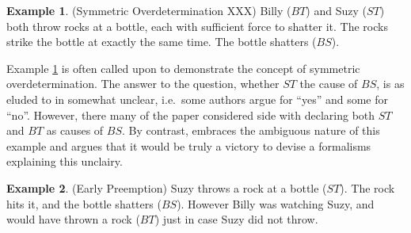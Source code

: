 \documentclass[11pt,a4paper]{book}
\theoremstyle{definition}
\theoremstyle{definition}
\newtheorem{example}{Example}[section]
\theoremstyle{definition}
\theoremstyle{remark}
\begin{document}
\begin{example}(Symmetric Overdetermination XXX)
\label{ex:sym-overdetermination}
Billy ($BT$) and Suzy ($ST$) both throw rocks at a bottle, each with sufficient force to shatter it. The rocks strike the bottle at exactly the same time. The bottle shatters ($BS$).
\begin{center}
\end{center}
\end{example}

Example \ref{ex:sym-overdetermination} is often called upon to demonstrate the concept of symmetric overdetermination. The  answer to the question, whether $ST$ the cause of $BS$, is as eluded to in \cite{hiddleston2005causal} somewhat unclear, i.e.\ some authors argue for ``yes'' and some for ``no''. However, there many of the paper considered side with declaring both $ST$ and $BT$ as causes of $BS$.
By contrast, \cite{hiddleston2005causal} embraces the ambiguous nature of this example and argues that it would be truly a victory to devise a formalisms explaining this unclairy.



\begin{example}(Early Preemption)
\label{ex:backup}
Suzy throws a rock at a bottle ($ST$). The rock hits it, and the bottle shatters ($BS$). However Billy was watching Suzy, and would have thrown a rock ($BT$) just in case Suzy did not throw.
\begin{center}
\end{center}
\end{example}
\end{document}
